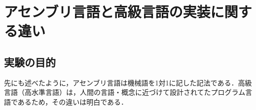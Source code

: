 \section{アセンブリ言語と高級言語の実装に関する違い}
\subsection{実験の目的}
先にも述べたように，アセンブリ言語は機械語を1対1に記した記法である．高級言語（高水準言語）は，人間の言語・概念に近づけて設計されてたプログラム言語であるため\cite{高水準言語}，その違いは明白である．\par
